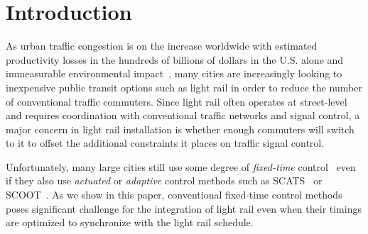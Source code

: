 \section{Introduction}

%
%
%

As urban traffic congestion is on the increase worldwide with
estimated productivity losses in the hundreds of billions of dollars
in the U.S. alone and immeasurable environmental
impact~\cite{bazzan2013intro}, many cities are increasingly looking to
inexpensive public transit options such as light rail in order to
reduce the number of conventional traffic commuters.  Since light rail
often operates at street-level and requires coordination with
conventional traffic networks and signal control, a major concern in
light rail installation is whether enough commuters will switch to it
to offset the additional constraints it places on traffic signal
control.

Unfortunately, many large cities still use some
degree of \emph{fixed-time} control~ even
if they also use \emph{actuated} or \emph{adaptive} control methods
such as SCATS~ or SCOOT~.
As we show in this paper, conventional fixed-time control methods
poses significant challenge for the integration of light
rail even when their timings are optimized to synchronize with
the light rail schedule.

